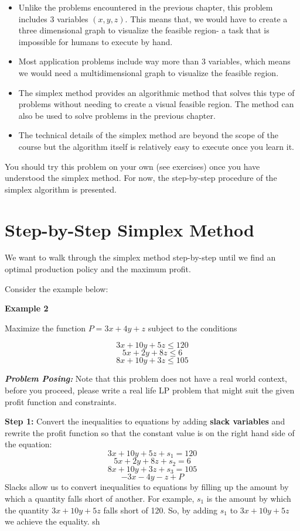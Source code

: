 \documentclass[
  letterpaper,
  DIV=11,
  numbers=noendperiod]{scrreprt}
\providecommand{\tightlist}{%
  \setlength{\itemsep}{0pt}\setlength{\parskip}{0pt}}\usepackage{longtable,booktabs,array}
\begin{document}
\begin{itemize}
\tightlist
\item
  Unlike the problems encountered in the previous chapter, this problem
  includes 3 variables \((x,y, z).\) This means that, we would have to
  create a three dimensional graph to visualize the feasible region- a
  task that is impossible for humans to execute by hand.
\item
  Most application problems include way more than 3 variables, which
  means we would need a multidimensional graph to visualize the feasible
  region.
\item
  The simplex method provides an algorithmic method that solves this
  type of problems without needing to create a visual feasible region.
  The method can also be used to solve problems in the previous chapter.
\item
  The technical details of the simplex method are beyond the scope of
  the course but the algorithm itself is relatively easy to execute once
  you learn it.
\end{itemize}

You should try this problem on your own (see exercises) once you have
understood the simplex method. For now, the step-by-step procedure of
the simplex algorithm is presented.

\hypertarget{step-by-step-simplex-method}{%
\section{Step-by-Step Simplex
Method}\label{step-by-step-simplex-method}}

We want to walk through the simplex method step-by-step until we find an
optimal production policy and the maximum profit.

Consider the example below:

\textbf{Example 2}

Maximize the function \(P=3x+4y+z\) subject to the conditions

\[3x+10y+5z \le 120 \] \[5x+2y+8z \le 6\] \[8x+10y+3z \le 105\]

\textbf{\emph{Problem Posing:}} Note that this problem does not have a
real world context, before you proceed, please write a real life LP
problem that might suit the given profit function and constraints.

\textbf{Step 1:} Convert the inequalities to equations by adding
\textbf{slack variables} and rewrite the profit function so that the
constant value is on the right hand side of the equation:
\[3x+10y+5z+s_1 = 120 \] \[5x+2y+8z +s_2= 6\] \[8x+10y+3z +s_3= 105\]
\[-3x-4y-z+P\] Slacks allow us to convert inequalities to equations by
filling up the amount by which a quantity falls short of another. For
example, \(s_1\) is the amount by which the quantity \(3x+10y+5z\) falls
short of 120. So, by adding \(s_1\) to \(3x+10y+5z\) we achieve the
equality. sh
\end{document}
